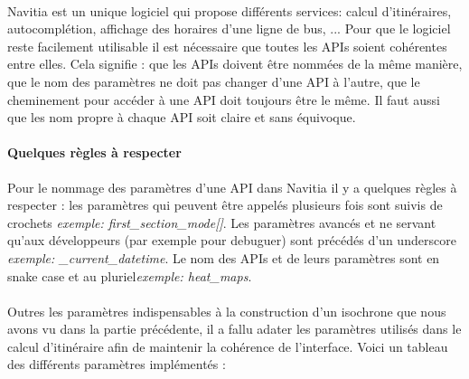 \documentclass[a4paper]{report}
\begin{document}
\paragraph{} Navitia est un unique logiciel qui propose différents services: calcul d'itinéraires, autocomplétion, affichage des horaires d'une ligne de bus, ... Pour que le logiciel reste facilement utilisable il est nécessaire que toutes les APIs soient cohérentes entre elles. Cela signifie : que les APIs doivent être nommées de la même manière, que le nom des paramètres ne doit pas changer d'une API à l'autre, que le cheminement pour accéder à une API doit toujours être le même. Il faut aussi que les nom propre à chaque API soit claire et sans équivoque. 

\paragraph{Quelques règles à respecter} Pour le nommage des paramètres d'une API dans Navitia il y a quelques règles à respecter : les paramètres qui peuvent être appelés plusieurs fois sont suivis de crochets \emph{exemple: first\_section\_mode[]}. Les paramètres avancés et ne servant qu'aux développeurs (par exemple pour debuguer) sont précédés d'un underscore \emph{exemple: \_current\_datetime}. Le nom des APIs et de leurs paramètres sont en snake case et au pluriel\emph{exemple: heat\_maps}.

\paragraph{} Outres les paramètres indispensables à la construction d'un isochrone que nous avons vu dans la partie précédente, il a fallu adater les paramètres utilisés dans le calcul d'itinéraire afin de maintenir la cohérence de l'interface. Voici un tableau des différents paramètres implémentés :
\end{document}
